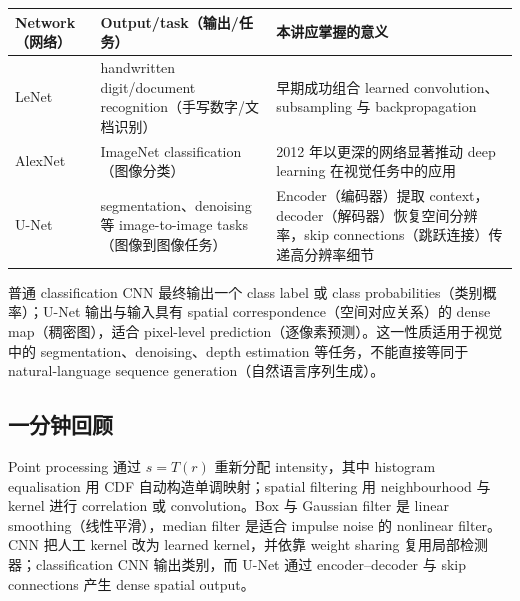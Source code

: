 \begin{center}
\small
\begin{tabularx}{\textwidth}{@{}>{\raggedright\arraybackslash}p{2cm}>{\raggedright\arraybackslash}p{3.5cm}X@{}}
  \toprule
  Network（网络） & Output/task（输出/任务） & 本讲应掌握的意义 \\
  \midrule
  LeNet & handwritten digit/document recognition（手写数字/文档识别） & 早期成功组合 learned convolution、subsampling 与 backpropagation \\
  AlexNet & ImageNet classification（图像分类） & 2012 年以更深的网络显著推动 deep learning 在视觉任务中的应用 \\
  U-Net & segmentation、denoising 等 image-to-image tasks（图像到图像任务） & Encoder（编码器）提取 context，decoder（解码器）恢复空间分辨率，skip connections（跳跃连接）传递高分辨率细节 \\
  \bottomrule
\end{tabularx}
\end{center}

普通 classification CNN 最终输出一个 class label 或 class probabilities（类别概率）；U-Net 输出与输入具有 spatial correspondence（空间对应关系）的 dense map（稠密图），适合 pixel-level prediction（逐像素预测）。这一性质适用于视觉中的 segmentation、denoising、depth estimation 等任务，不能直接等同于 natural-language sequence generation（自然语言序列生成）。

\subsection{一分钟回顾}

Point processing 通过 $s=T(r)$ 重新分配 intensity，其中 histogram equalisation 用 CDF 自动构造单调映射；spatial filtering 用 neighbourhood 与 kernel 进行 correlation 或 convolution。Box 与 Gaussian filter 是 linear smoothing（线性平滑），median filter 是适合 impulse noise 的 nonlinear filter。CNN 把人工 kernel 改为 learned kernel，并依靠 weight sharing 复用局部检测器；classification CNN 输出类别，而 U-Net 通过 encoder--decoder 与 skip connections 产生 dense spatial output。
